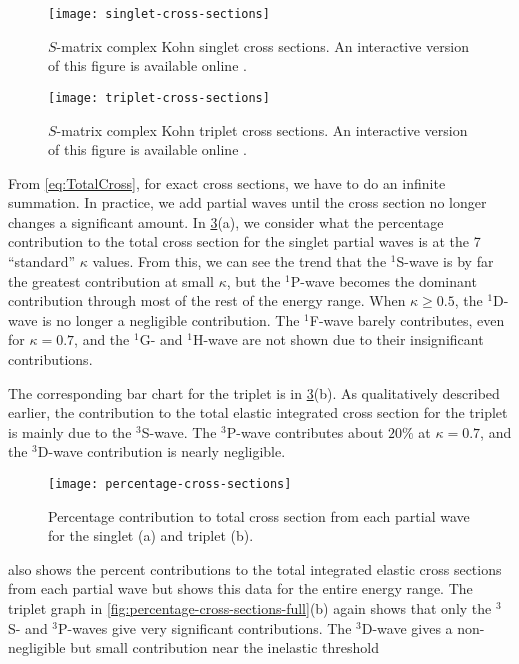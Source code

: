 \documentclass[Dissertation.tex]{subfiles}
\begin{document}
\begin{figure}
	\centering
	\texttt{[image: singlet-cross-sections]}
	\caption{$S$-matrix complex Kohn singlet cross sections. An interactive version of this
figure is available online \cite{Plotly}.}
	\label{fig:singlet-cross-sections}
\end{figure}

\begin{figure}
	\centering
	\texttt{[image: triplet-cross-sections]}
	\caption{$S$-matrix complex Kohn triplet cross sections. An interactive version of this
figure is available online \cite{Plotly}.}
	\label{fig:triplet-cross-sections}
\end{figure}

From \cref{eq:TotalCross}, for exact cross sections, we have to do an infinite
summation. In practice, we add partial waves until the cross section no longer
changes a significant amount. In \cref{fig:percentage-cross-sections}(a), we
consider what the percentage contribution to the total cross section for
the singlet partial waves is at the 7 ``standard'' $\kappa$ values. From this,
we can see the trend that the $^1$S-wave is by far the greatest contribution at
small $\kappa$, but the $^1$P-wave becomes the dominant contribution through
most of the rest of the energy range. When $\kappa \geq 0.5$, the $^1$D-wave is
no longer a negligible contribution. The $^1$F-wave barely contributes, even
for $\kappa = 0.7$, and the $^1$G- and $^1$H-wave are not shown due to their
insignificant contributions.

The corresponding bar chart for the triplet is in
\cref{fig:percentage-cross-sections}(b). As qualitatively described earlier,
the contribution to the total elastic integrated cross section for
the triplet is mainly due to the $^3$S-wave. The $^3$P-wave contributes about
$20\%$ at $\kappa = 0.7$, and the $^3$D-wave contribution is nearly negligible.

\begin{figure}
	\centering
	\texttt{[image: percentage-cross-sections]}
	\caption[Percentage contribution to total cross section]{Percentage contribution to total cross section from each partial wave for the singlet (a) and triplet (b).}
	\label{fig:percentage-cross-sections}
\end{figure}

 also shows the percent contributions to 
the total integrated elastic cross sections from each partial wave but shows
this data for the entire energy range. The triplet graph in
\cref{fig:percentage-cross-sections-full}(b) again shows that only the $^3$S- and
$^3$P-waves give very significant contributions. The $^3$D-wave gives a
non-negligible but small contribution near the inelastic threshold
\end{document}
